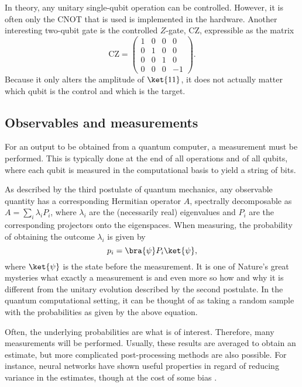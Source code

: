 In theory, any unitary single-qubit operation can be controlled.
However, it is often only the CNOT that is used is implemented in the hardware.
Another interesting two-qubit gate is the controlled $Z$-gate, CZ, expressible as the matrix
\begin{equation}
    \text{CZ} = \begin{pmatrix} 1 & 0 & 0 & 0 \\ 0 & 1 & 0 & 0 \\ 0 & 0 & 1 & 0 \\ 0 & 0 & 0 & -1 \end{pmatrix}.
\end{equation}
Because it only alters the amplitude of $\ket{11}$, it does not actually matter which qubit is the control and which is the target.

\subsection{Observables and measurements}
For an output to be obtained from a quantum computer, a measurement must be performed.
This is typically done at the end of all operations and of all qubits, where each qubit is measured in the computational basis to yield a string of bits.

As described by the third postulate of quantum mechanics, any observable quantity has a corresponding Hermitian operator $A$, spectrally decomposable as $A = \sum_{i} \lambda_i P_i$, where $\lambda_i$ are the (necessarily real) eigenvalues and $P_i$ are the corresponding projectors onto the eigenspaces.
When measuring, the probability of obtaining the outcome $\lambda_i$ is given by
\begin{equation}
    p_i = \bra{\psi} P_i \ket{\psi},
\end{equation}
where $\ket{\psi}$ is the state before the measurement.
It is one of Nature's great mysteries what exactly a measurement is and even more so how and why it is different from the unitary evolution described by the second postulate.
In the quantum computational setting, it can be thought of as taking a random sample with the probabilities as given by the above equation.

Often, the underlying probabilities are what is of interest.
Therefore, many measurements will be performed.
Usually, these results are averaged to obtain an estimate, but more complicated post-processing methods are also possible.
For instance, neural networks have shown useful properties in regard of reducing variance in the estimates, though at the cost of some bias \autocite{torlai2020}.

